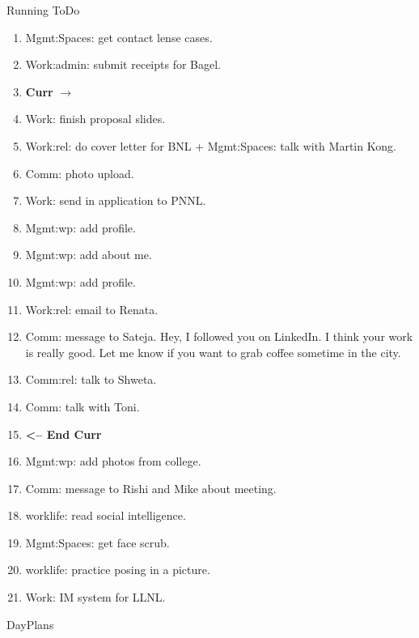 \begin{columns}
\begin{column}{0.6\linewidth}
\begin{block}{Running ToDo}
\begin{enumerate}
      \item \tiny Mgmt:Spaces: get contact lense cases. 
  
      \item \tiny Work:admin: submit receipts for Bagel. 

        \tiny \item[] \tiny \textbf{Curr} $\rightarrow$
    
      \item \tiny Work: finish proposal slides. 
      \item \tiny Work:rel: do cover letter for BNL + Mgmt:Spaces: talk with Martin Kong.
        
      \item \tiny Comm: photo upload. 
        
      \item \tiny Work: send in application to PNNL.
        
      \item \tiny Mgmt:wp: add profile.
      \item \tiny Mgmt:wp: add about me. 
        
      \item \tiny Mgmt:wp: add profile. 
\item \tiny Work:rel: email to Renata.  
\item \tiny Comm: message to Sateja. 
  Hey, I followed you on LinkedIn. I think your work is really good. 
  Let me know if you want to grab coffee sometime in the city. 
  
\item \tiny Comm:rel: talk to Shweta.
\item \tiny Comm: talk with Toni. 
  
\item \tiny \textbf{ <-- End Curr }
\item \tiny Mgmt:wp: add photos from college. 
\item \tiny Comm: message to Rishi and Mike about meeting. 
\item \tiny worklife: read social intelligence.  
\item \tiny Mgmt:Spaces: get face scrub. 
\item \tiny worklife: practice posing in a picture.  
\item \tiny Work: IM system for LLNL.  
      \end{enumerate}
    \end{block} 


\begin{block}{DayPlans} 


\end{block}
\end{column}
\end{columns}
